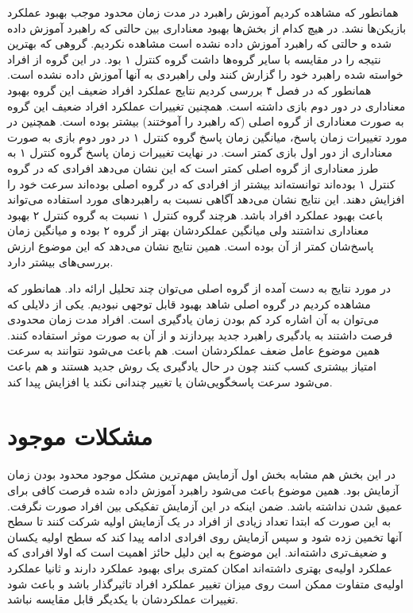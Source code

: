 \documentclass[twoside, a4paper,11pt]{book}
\numberwithin{equation}{chapter}
\numberwithin{table}{chapter}
\numberwithin{figure}{chapter}
\numberwithin{equation}{chapter}
\begin{document}
همانطور که مشاهده کردیم آموزش راهبرد در مدت زمان محدود موجب بهبود عملکرد بازیکن‌ها نشد. در هیچ کدام از بخش‌ها بهبود معناداری بین حالتی که راهبرد آموزش داده شده و حالتی که راهبرد آموزش داده نشده است مشاهده نکردیم. گروهی که بهترین نتیجه را در مقایسه با سایر گروه‌ها داشت گروه کنترل ۱ بود. در این گروه از افراد خواسته شده راهبرد خود را گزارش کنند ولی راهبردی به آنها آموزش داده نشده است. همانطور که در فصل ۴ بررسی کردیم نتایج عملکرد افراد ضعیف این گروه بهبود معناداری در دور دوم بازی داشته است. همچنین تغییرات عملکرد افراد ضعیف این گروه به صورت معناداری از گروه اصلی (که راهبرد را آموختند) بیشتر بوده است. همچنین در مورد تغییرات زمان پاسخ، میانگین زمان پاسخ گروه کنترل ۱ در دور دوم بازی به صورت معناداری از دور اول بازی کمتر است. در نهایت تغییرات زمان پاسخ گروه کنترل ۱ به طرز معناداری از گروه اصلی کمتر است که این نشان می‌دهد افرادی که در گروه کنترل ۱ بوده‌اند توانسته‌اند بیشتر از افرادی که در گروه اصلی بوده‌اند سرعت خود را افزایش دهند. این نتایج نشان می‌دهد آگاهی نسبت به راهبردهای مورد استفاده می‌تواند باعث بهبود عملکرد افراد باشد. هرچند گروه کنترل ۱ نسبت به گروه کنترل ۲ بهبود معناداری نداشتند ولی میانگین عملکردشان بهتر از گروه ۲ بوده و میانگین زمان پاسخ‌شان کمتر از آن بوده است. همین نتایج نشان می‌دهد که این موضوع ارزش بررسی‌های بیشتر دارد.

در مورد نتایج به دست آمده از گروه اصلی می‌توان چند تحلیل ارائه داد. همانطور که مشاهده کردیم در گروه اصلی شاهد بهبود قابل توجهی نبودیم. یکی از دلایلی که می‌توان به آن اشاره کرد کم بودن زمان یادگیری است. افراد مدت زمان محدودی فرصت داشتند به یادگیری راهبرد جدید بپردازند و از آن به صورت موثر استفاده کنند. همین موضوع عامل ضعف عملکردشان است. هم باعث می‌شود نتوانند به سرعت امتیاز بیشتری کسب کنند چون در حال یادگیری یک روش جدید هستند و هم باعث می‌شود سرعت پاسخگویی‌شان یا تغییر چندانی نکند یا افزایش پیدا کند. 

\section{مشکلات موجود}

در این بخش هم مشابه بخش اول آزمایش مهم‌ترین مشکل موجود محدود بودن زمان آزمایش بود. همین موضوع باعث می‌شود راهبرد آموزش داده شده فرصت کافی برای عمیق شدن نداشته باشد. ضمن اینکه در این آزمایش تفکیکی بین افراد صورت نگرفت. به این صورت که ابتدا تعداد زیادی از افراد در یک آزمایش اولیه شرکت کنند تا سطح آنها تخمین زده شود و سپس آزمایش روی افرادی ادامه پیدا کند که سطح اولیه یکسان و ضعیف‌تری داشته‌اند. این موضوع به این دلیل حائز اهمیت است که اولا افرادی که عملکرد اولیه‌ی بهتری داشته‌اند امکان کمتری برای بهبود عملکرد دارند و ثانیا عملکرد اولیه‌ی متفاوت ممکن است روی میزان تغییر عملکرد افراد تاثیرگذار باشد و باعث شود تغییرات عملکردشان با یکدیگر قابل مقایسه نباشد.
\end{document}
